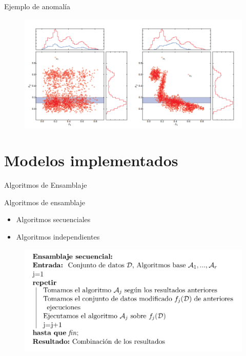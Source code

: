 \documentclass[10pt]{beamer}
\begin{document}
\begin{frame}[fragile]{Ejemplo de anomalía}
\vspace{10px}
\pause
{}

\begin{figure}
	\centering
	\includegraphics[scale=0.5]{Imagenes/ejemplo_anomalia_probabilidad}
\end{figure}

\end{frame}

\section{Modelos implementados}

\begin{frame}[fragile]{Algoritmos de Ensamblaje}
\vspace{10px}
\pause
{}

\begin{block}{Algoritmos de ensamblaje}
	\begin{itemize}
		\item Algoritmos secuenciales
		\pause
		\item Algoritmos independientes
	\end{itemize}
\end{block}

\pause

\begin{figure}
	\centering
	\includegraphics[scale=0.3]{Imagenes/ensamblaje-secuencial}
\end{figure}

\end{frame}
\end{document}
